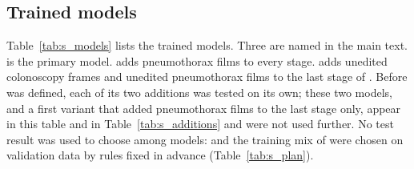 \subsection{Trained models}

Table~\ref{tab:s_models} lists the trained models. Three are named in the main text. \ms{} is the primary model. \msp{} adds pneumothorax films to every stage. \msn{} adds unedited colonoscopy frames and unedited pneumothorax films to the last stage of \msp. Before \msn{} was defined, each of its two additions was tested on its own; these two models, and a first variant that added pneumothorax films to the last stage only, appear in this table and in Table~\ref{tab:s_additions} and were not used further. No test result was used to choose among models: \ms{} and the training mix of \msn{} were chosen on validation data by rules fixed in advance (Table~\ref{tab:s_plan}).

